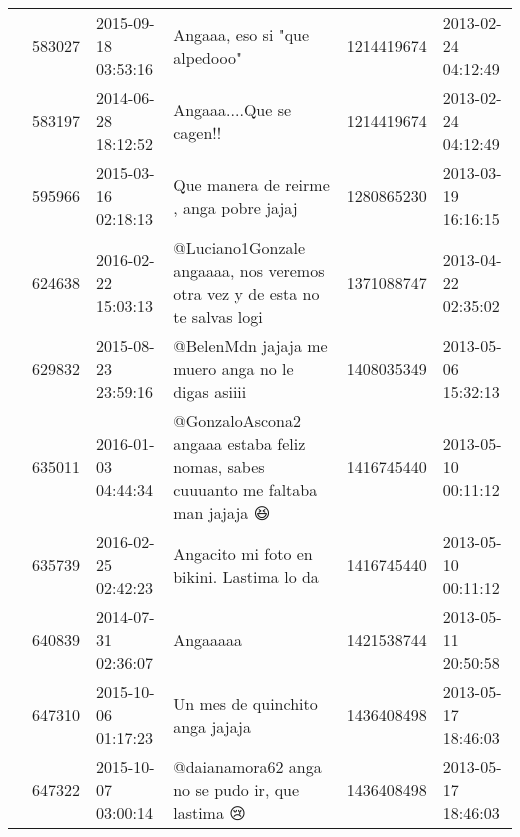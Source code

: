 \begin{tabular}{llllrl}
           & 583027  & 2015-09-18 03:53:16 &                                                                                                                Angaaa, eso si "que alpedooo" &  1214419674 & 2013-02-24 04:12:49 \\
           & 583197  & 2014-06-28 18:12:52 &                                                                                                                     Angaaa....Que se cagen!! &  1214419674 & 2013-02-24 04:12:49 \\
           & 595966  & 2015-03-16 02:18:13 &                                                                                                      Que manera de reirme , anga pobre jajaj &  1280865230 & 2013-03-19 16:16:15 \\
           & 624638  & 2016-02-22 15:03:13 &                                                                   @Luciano1Gonzale angaaaa, nos veremos otra vez y de esta no te salvas logi &  1371088747 & 2013-04-22 02:35:02 \\
           & 629832  & 2015-08-23 23:59:16 &                                                                                            @BelenMdn jajaja me muero anga no le digas asiiii &  1408035349 & 2013-05-06 15:32:13 \\
           & 635011  & 2016-01-03 04:44:34 &                                                            @GonzaloAscona2 angaaa estaba feliz nomas, sabes cuuuanto me faltaba man jajaja 😆 &  1416745440 & 2013-05-10 00:11:12 \\
           & 635739  & 2016-02-25 02:42:23 &                                                                                                    Angacito mi foto en bikini. Lastima lo da &  1416745440 & 2013-05-10 00:11:12 \\
           & 640839  & 2014-07-31 02:36:07 &                                                                                                                                     Angaaaaa &  1421538744 & 2013-05-11 20:50:58 \\
           & 647310  & 2015-10-06 01:17:23 &                                                                                                              Un mes de quinchito anga jajaja &  1436408498 & 2013-05-17 18:46:03 \\
           & 647322  & 2015-10-07 03:00:14 &                                                                                              @daianamora62 anga no se pudo ir, que lastima 😢 &  1436408498 & 2013-05-17 18:46:03 \\

\end{tabular}
